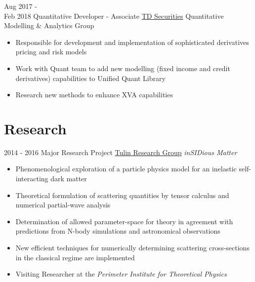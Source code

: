 \documentclass[letterpaper]{twentysecondcv} %
\begin{document}
\begin{twenty}
	\twentyitem
    	{Aug 2017 - \\ Feb 2018}
        {Quantitative Developer - Associate}
        {\href{http://www.td.com/}{TD Securities}}
        {Quantitative Modelling \& Analytics Group}
        {
        {\begin{itemize}
        \item Responsible for development and implementation of sophisticated derivatives pricing and risk models
        \item Work with Quant team to add new modelling (fixed income and credit derivatives) capabilities to Unified Quant Library  
        \item Research new methods to enhance XVA capabilities
    \end{itemize}}
        }
\end{twenty}


\vfill


\section{Research}
\begin{twenty}
	\twentyitem
    	{2014 - 2016}
        {Major Research Project}
        {\href{http://www.yorku.ca/stulin/research.html}{Tulin Research Group}}
        {\emph{inSIDious Matter}}
        {
        {\begin{itemize}
        \item Phenomenological exploration of a particle physics model for an inelastic self-interacting dark matter 
        \item Theoretical formulation of scattering quantities by tensor calculus and numerical partial-wave analysis
        \item Determination of allowed parameter-space for theory in agreement with predictions from N-body simulations and astronomical observations
       	\item New efficient techniques for numerically determining scattering cross-sections in the classical regime are implemented
    	\item Visiting Researcher at the \emph{Perimeter Institute for Theoretical Physics}
    \end{itemize}}

        }
\end{twenty}

\vfill

\end{document}
